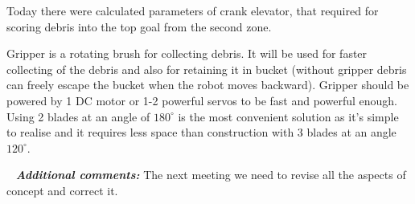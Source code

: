 \begin{enumerate*}
  	\item Today there were calculated parameters of crank elevator, that required for scoring debris into the top goal from the second zone.
  	\begin{figure}[H]
  		\begin{minipage}[h]{1\linewidth}
  			\caption{}
  		\end{minipage}
  	\end{figure}
  	
  	\item Gripper is a rotating brush for collecting debris. It will be used for faster collecting of the debris and also for retaining it in bucket (without gripper debris can freely escape the bucket when the robot moves backward). Gripper should be powered by 1 DC motor or 1-2 powerful servos to be fast and powerful enough. Using 2 blades at an angle of $180^\circ$ is the most convenient solution as it's simple to realise and it requires less space than construction with 3 blades at an angle $120^\circ$.
  	\begin{figure}[H]
  		\begin{minipage}[h]{1\linewidth}
  			\caption{}
  		\end{minipage}
  	\end{figure}
  	
  \end{enumerate*}
  
   \newline
  \textit{\textbf{Additional comments:}} The next meeting we need to revise all the aspects of concept and correct it.
  
\fillpage
